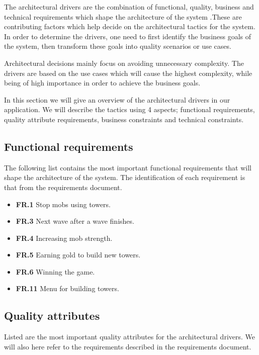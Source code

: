 \label{drivers} The architectural drivers are the combination of functional, quality, business and technical requirements which shape the architecture of the system \cite{bass2003software}.These are contributing factors which help decide on the architectural tactics for the system.  
In order to determine the drivers, one need to first identify the business goals of the system, then transform these goals into quality scenarios or use cases. 

Architectural decisions mainly focus on avoiding unnecessary complexity. The drivers are based on the use cases which will cause the highest complexity, while being of high importance in order to achieve the business goals.

In this section we will give an overview of the architectural drivers in our application. We will describe the tactics using 4 aspects; functional requirements, quality attribute requirements, business constraints and technical constraints.

\subsection{Functional requirements}
The following list contains the most important functional requirements that will shape the architecture of the system. The identification of each requirement is that from the requirements document\cite{reqdoc}.

\begin{itemize}
        \item \textbf{FR.1} Stop mobs using towers.
        \item \textbf{FR.3} Next wave after a wave finishes.
        \item \textbf{FR.4} Increasing mob strength.
        \item \textbf{FR.5} Earning gold to build new towers.
        \item \textbf{FR.6} Winning the game.
        \item \textbf{FR.11} Menu for building towers.
\end{itemize}

\subsection{Quality attributes}
Listed are the most important quality attributes for the architectural drivers. We will also here refer to the requirements described in the requirements document.

